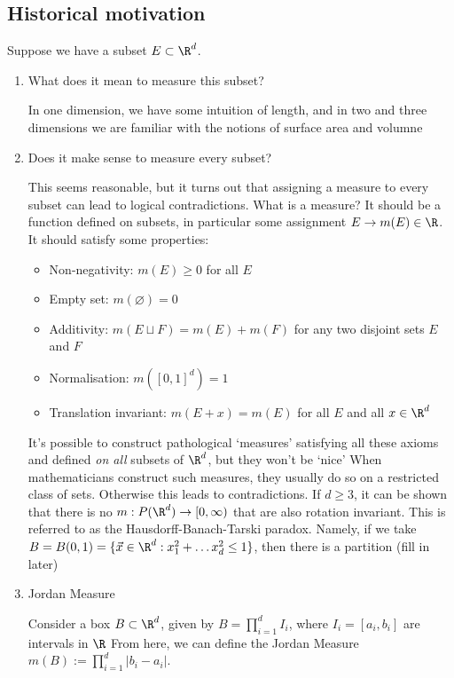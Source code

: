 \documentclass{article}
\begin{document}
\subsection{Historical motivation}
Suppose we have a subset $E \subset \R^d$.
\begin{enumerate}
    \item What does it mean to measure this subset?

        In one dimension, we have some intuition of length, and in two and three dimensions we are familiar with the notions of surface area and volumne

    \item Does it make sense to measure every subset?

        This seems reasonable, but it turns out that assigning a measure to every subset can lead to logical contradictions.
        What is a measure? It should be a function defined on subsets, in particular some assignment $E \to m(E) \in \R$.  It should satisfy some properties:
        \begin{itemize}
            \item Non-negativity: $m(E) \geq 0$ for all $E$
            \item Empty set: $m(\varnothing) = 0$
            \item Additivity: $m(E \sqcup F) = m(E) + m(F)$ for any two disjoint sets $E$ and $F$
            \item Normalisation: $m([0, 1]^d) = 1$
            \item Translation invariant: $m(E + x) = m(E)$ for all $E$ and all $x \in \R^d$
        \end{itemize}
        It's possible to construct pathological `measures' satisfying all these axioms and defined \emph{on all} subsets of $\R^d$, but they won't be `nice'
        When mathematicians construct such measures, they usually do so on a restricted class of sets. Otherwise this leads to contradictions.
        If $d \geq 3$, it can be shown that there is no $m: P(\R^d) \to [0, \infty)$ that are also rotation invariant.  This is referred to as the Hausdorff-Banach-Tarski paradox.
        Namely, if we take $B = B(0, 1) = \{\vec{x} \in \R^d: x_1^2 + \dots x_d^2 \leq 1\}$, then there is a partition (fill in later)

    \item Jordan Measure

        Consider a box $B \subset \R^d$, given by $B = \prod_{i=1}^d I_i$, where $I_i = [a_i, b_i]$ are intervals in $\R$
        From here, we can define the Jordan Measure $m(B) := \prod_{i=1}^d |b_i - a_i|$.

\end{enumerate}
\end{document}
